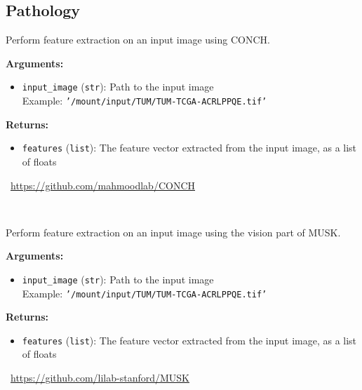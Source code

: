 \subsection{Pathology}
\label{app:tasks:pathology}
\begin{tcolorbox}[title={\texttt{conch\_extract\_features}}]
Perform feature extraction on an input image using CONCH.

\vspace{.5em}
\textbf{Arguments:}
\begin{itemize}[topsep=0pt,parsep=-1pt,partopsep=0pt]
\item \texttt{input\_image} (\texttt{str}): Path to the input image\\  Example: \texttt{'/mount/input/TUM/TUM-TCGA-ACRLPPQE.tif'}
\end{itemize}

\vspace{.5em}
\textbf{Returns:} \begin{itemize}[topsep=0pt,parsep=-1pt,partopsep=0pt]
\item \texttt{features} (\texttt{list}): The feature vector extracted from the input image, as a list of floats
\end{itemize}
\tcblower
\setlength{\hangindent}{\widthof{\faGithub~}}
\faGithub~\url{https://github.com/mahmoodlab/CONCH}

\vspace{.5em}\setlength{\hangindent}{\widthof{\faFile*[regular]~}}\faFile*[regular]~


\end{tcolorbox}

\begin{tcolorbox}[title={\texttt{musk\_extract\_features}}]
Perform feature extraction on an input image using the vision part of MUSK.

\vspace{.5em}
\textbf{Arguments:}
\begin{itemize}[topsep=0pt,parsep=-1pt,partopsep=0pt]
\item \texttt{input\_image} (\texttt{str}): Path to the input image\\  Example: \texttt{'/mount/input/TUM/TUM-TCGA-ACRLPPQE.tif'}
\end{itemize}

\vspace{.5em}
\textbf{Returns:} \begin{itemize}[topsep=0pt,parsep=-1pt,partopsep=0pt]
\item \texttt{features} (\texttt{list}): The feature vector extracted from the input image, as a list of floats
\end{itemize}
\tcblower
\setlength{\hangindent}{\widthof{\faGithub~}}
\faGithub~\url{https://github.com/lilab-stanford/MUSK}

\vspace{.5em}\setlength{\hangindent}{\widthof{\faFile*[regular]~}}\faFile*[regular]~


\end{tcolorbox}

